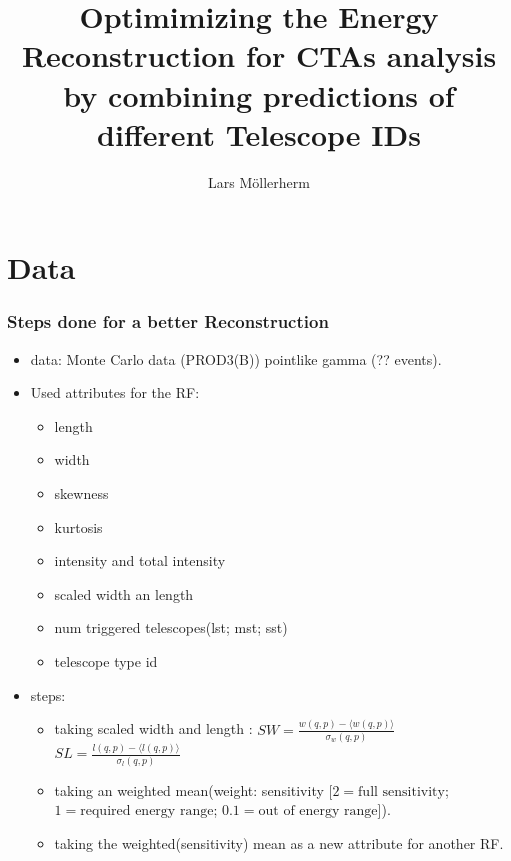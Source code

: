 \documentclass[aspectratio=1610, professionalfonts, 9pt]{beamer}
\title{Optimimizing the Energy Reconstruction for CTAs analysis by combining predictions of different Telescope IDs}
\author[L.~Möllerherm]{Lars Möllerherm}
\institute[Experimentelle Physik Vb]{Experimentelle Physik Vb \\  Fakultät Physik}
\begin{document}
\maketitle

\section{Data}
  \begin{frame}
    \frametitle{Steps done for a better Reconstruction}
    \begin{itemize}
      \item data: Monte Carlo data (PROD3(B)) \- pointlike gamma (?? events).

      \item Used attributes for the RF:
      \begin{itemize}
        \item length
        \item width
        \item skewness
        \item kurtosis
        \item intensity and total intensity
        \item scaled width an length
        \item num triggered telescopes(lst; mst; sst)
        \item telescope type id
      \end{itemize}

      \item steps:
      \begin{itemize}
        \item taking scaled width and length  \cite[104]{HESS}: $SW =\frac{w(q,p)-\langle w(q,p) \rangle}{\sigma_w(q,p)}$  $SL = \frac{l(q,p)-\langle l(q,p) \rangle}{\sigma_l(q,p)}$
        \item taking an weighted mean(weight: sensitivity [$2 = \text{full sensitivity}$; $1 = \text{required energy range}$; $0.1 = \text{out of energy range}$]).
        \item taking the weighted(sensitivity) mean as a new attribute for another RF.
      \end{itemize}
    \end{itemize}

  \end{frame}
\end{document}
